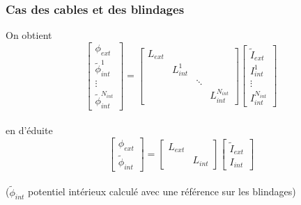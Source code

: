\begin{frame}
\frametitle{Cas des cables et des blindages}
On obtient
\[ \left[ \begin{array} {c}
\phi_{ext} \\
\tilde{\phi}^1_{int}  \\
\vdots \\
\tilde{\phi}^{N_{int}}_{int} \end{array}  \right]  = 
\left[ \begin{array} {cccc}
L_{ext} & & & \\
  & L^1_{int}& &  \\
 & &\ddots &  \\
 & & & L^{N_{int}}_{int} \end{array}  \right]
 \left[ \begin{array} {c}
\tilde{I}_{ext} \\
I^1_{int}  \\
\vdots \\
I^{N_{int}}_{int} \end{array}  \right] 
\] \\[0.6cm]
en d'\'eduite
\[ \left[ \begin{array} {c}
\phi_{ext} \\
\tilde{\phi}_{int} \end{array}  \right]  = 
\left[ \begin{array} {cc}
L_{ext} & \\
  & L_{int}  \end{array}  \right]
 \left[ \begin{array} {c}
\tilde{I}_{ext} \\
I_{int} \end{array}  \right] 
\] \\[0.6cm]
($\tilde{\phi}_{int}$ potentiel int\'erieux calcul\'e avec une r\'ef\'erence sur les blindages)
\end{frame}


